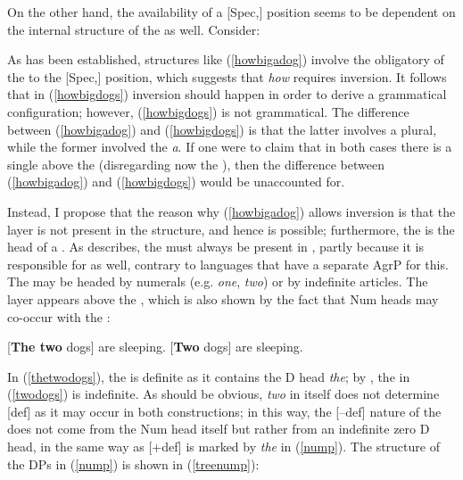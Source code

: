 On the other hand, the availability of a [Spec,] position seems to be dependent on the internal structure of the  as well. Consider:

\ea \label{howbignum}
 \label{howbigadog}
 \label{howbigdogs}
\z
\z
	
As has been established, structures like (\ref{howbigadog}) involve the obligatory  of the  to the [Spec,] position, which suggests that \textit{how} requires inversion. It follows that in (\ref{howbigdogs}) inversion should happen in order to derive a grammatical configuration; however, (\ref{howbigdogs}) is not grammatical. The difference between (\ref{howbigadog}) and (\ref{howbigdogs}) is that the latter involves a plural, while the former involved the  \textit{a}. If one were to claim that in both cases there is a single  above the  (disregarding now the ), then the difference between (\ref{howbigadog}) and (\ref{howbigdogs}) would be unaccounted for.

Instead, I propose that the reason why (\ref{howbigadog}) allows inversion is that the  layer is not present in the structure, and hence  is possible; furthermore, the  is the head of a . As \citet[11]{zamparelli2008} describes, the  must always be present in , partly because it is responsible for  as well, contrary to  languages that have a separate AgrP for this. The  may be headed by numerals (e.g. \textit{one}, \textit{two}) or by indefinite articles. The  layer appears above the , which is also shown by the fact that Num heads may co-occur with the :

\ea \label{nump}
\ea	{}[\textbf{The two} dogs] are sleeping. \label{thetwodogs}
\ex	{}[\textbf{Two} dogs] are sleeping. \label{twodogs}
\z
\z

In (\ref{thetwodogs}), the  is definite as it contains the D head \textit{the}; by , the  in (\ref{twodogs}) is indefinite. As should be obvious, \textit{two} in itself does not determine [\textpm{}def] as it may occur in both constructions; in this way, the [--def] nature of the  does not come from the Num head itself but rather from an indefinite zero D head, in the same way as [+def] is marked by \textit{the} in (\ref{nump}). The structure of the DPs in (\ref{nump}) is shown in (\ref{treenump}):

